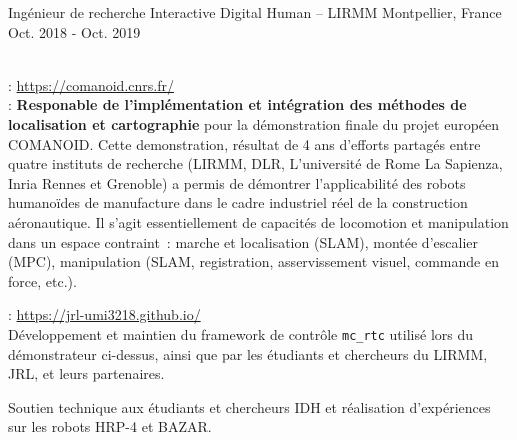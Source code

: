 \begin{cventries}
  \cventry
    {Ingénieur de recherche} %
    {Interactive Digital Human -- LIRMM} %
    {Montpellier, France} %
    {Oct. 2018 - Oct. 2019} %
    {
      \begin{cvitems} %
        \item {}\\
          : \url{https://comanoid.cnrs.fr/}\\
          : \textbf{Responable de l'implémentation et intégration des méthodes de localisation et cartographie} pour la démonstration finale du projet européen COMANOID. Cette demonstration, résultat de 4 ans d'efforts partagés entre quatre instituts de recherche (LIRMM, DLR, L'université de Rome La Sapienza, Inria Rennes et Grenoble) a permis de démontrer l'applicabilité des robots humanoïdes de manufacture dans le cadre industriel réel de la construction aéronautique. Il s'agit essentiellement de capacités de locomotion et manipulation dans un espace contraint~: marche et localisation (SLAM), montée d’escalier (MPC), manipulation (SLAM, registration, asservissement visuel, commande en force, etc.).
        \item {}: \url{https://jrl-umi3218.github.io/}\\
        Développement et maintien du framework de contrôle {\tt mc\_rtc} utilisé lors du  démonstrateur ci-dessus, ainsi que par les étudiants et chercheurs du LIRMM, JRL, et leurs partenaires.
        \item Soutien technique aux étudiants et chercheurs IDH et réalisation d'expériences sur les robots HRP-4 et BAZAR.
      \end{cvitems}
    }


\end{cventries}
